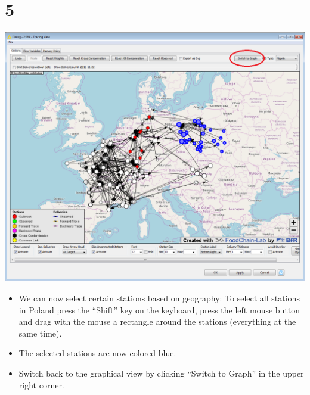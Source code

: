\documentclass[10pt]{beamer}
\begin{document}
\section{5}
\begin{frame}
	\begin{center}
  		\includegraphics[height=0.55\textheight]{5.png}
	\end{center}
	\begin{itemize}
		\item We can now select certain stations based on geography: To select all stations in Poland press the ``Shift'' key on the keyboard, press the left mouse button and drag with the mouse a rectangle around the stations (everything at the same time).
		\item The selected stations are now colored blue.
		\item Switch back to the graphical view by clicking ``Switch to Graph'' in the upper right corner.
	\end{itemize}
\end{frame}
\end{document}
